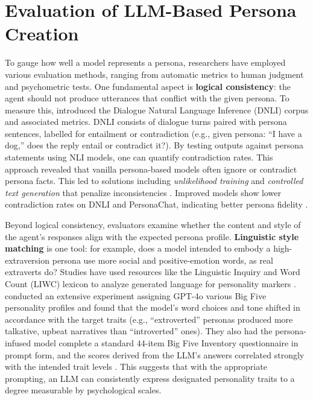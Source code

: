 \section{Evaluation of LLM-Based Persona Creation}
To gauge how well a model represents a persona, researchers have employed various evaluation methods, ranging from automatic metrics to human judgment and psychometric tests. One fundamental aspect is \textbf{logical consistency}: the agent should not produce utterances that conflict with the given persona. To measure this, \citet{welleck-etal-2019-dialogueNLI} introduced the Dialogue Natural Language Inference (DNLI) corpus and associated metrics. DNLI consists of dialogue turns paired with persona sentences, labelled for entailment or contradiction (e.g., given persona: ``I have a dog,'' does the reply entail or contradict it?). By testing outputs against persona statements using NLI models, one can quantify contradiction rates. This approach revealed that vanilla persona-based models often ignore or contradict persona facts. This led to solutions including \emph{unlikelihood training} and \emph{controlled text generation} that penalize inconsistencies \cite{li-etal-2020-dont, kim-etal-2020-will}. Improved models show lower contradiction rates on DNLI and PersonaChat, indicating better persona fidelity \cite{kim-etal-2020-will}.

Beyond logical consistency, evaluators examine whether the content and style of the agent's responses align with the expected persona profile. \textbf{Linguistic style matching} is one tool: for example, does a model intended to embody a high-extraversion persona use more social and positive-emotion words, as real extraverts do? Studies have used resources like the Linguistic Inquiry and Word Count (LIWC) lexicon to analyze generated language for personality markers \cite{jiang-etal-2023-personallm}. \citet{jiang-etal-2023-personallm} conducted an extensive experiment assigning GPT-4o various Big Five personality profiles and found that the model's word choices and tone shifted in accordance with the target traits (e.g., ``extroverted'' personas produced more talkative, upbeat narratives than ``introverted'' ones). They also had the persona-infused model complete a standard 44-item Big Five Inventory questionnaire in prompt form, and the scores derived from the LLM's answers correlated strongly with the intended trait levels \cite{jiang-etal-2023-personallm}. This suggests that with the appropriate prompting, an LLM can consistently express designated personality traits to a degree measurable by psychological scales.

